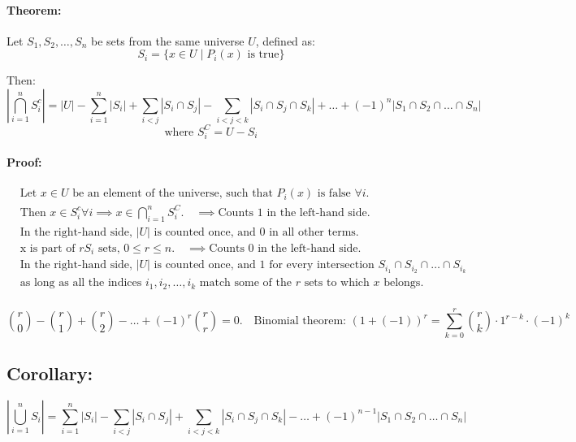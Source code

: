 \documentclass[11pt]{article}
\begin{document}
\paragraph{Theorem:}
Let $S_1, S_2, \dots, S_n$ be sets from the same universe $U$, defined as:
\[
S_i = \{x \in U \mid P_i(x) \text{ is true}\}
\]

Then:
\[
\left| \bigcap_{i=1}^{n} S_i^c \right| = \left| U \right| - \sum_{i=1}^{n} \left| S_i \right| + \sum_{i < j} \left| S_i \cap S_j \right| - \sum_{i < j < k} \left| S_i \cap S_j \cap S_k \right| + \dots + (-1)^n \left| S_1 \cap S_2 \cap \dots \cap S_n \right|
\]
\[
\text{where } S_i^C = U - S_i
\]

\paragraph{Proof:}
\begin{align*}
    &\text{Let } x \in U \text{ be an element of the universe, such that } P_i(x) \text{ is false } \forall i. \\
    &\text{Then } x \in S_i^c \forall i \implies x \in \bigcap_{i=1}^{n} S_i^C. \quad \implies \text{Counts 1 in the left-hand side.} \\
    &\text{In the right-hand side, } \left| U \right| \text{ is counted once, and 0 in all other terms.} \\
    &\text{x is part of } r S_i \text{ sets, } 0 \leq r \leq n. \quad \implies \text{Counts 0 in the left-hand side.} \\
    &\text{In the right-hand side, } \left| U \right| \text{ is counted once, and 1 for every intersection } S_{i_1} \cap S_{i_2} \cap \dots \cap S_{i_k} \\
    &\text{as long as all the indices } i_1, i_2, \dots, i_k \text{ match some of the } r \text{ sets to which } x \text{ belongs.} \\
\end{align*}

\[
\binom{r}{0} - \binom{r}{1} + \binom{r}{2} - \dots + (-1)^r \binom{r}{r} = 0. \quad \text{Binomial theorem: } (1 + (-1))^r = \sum_{k=0}^{r} \binom{r}{k} \cdot 1^{r-k} \cdot (-1)^k 
\]

\subsection*{Corollary:}
\[
\left| \bigcup_{i=1}^{n} S_i \right| = \sum_{i=1}^{n} \left| S_i \right| - \sum_{i < j} \left| S_i \cap S_j \right| + \sum_{i < j < k} \left| S_i \cap S_j \cap S_k \right| - \dots + (-1)^{n-1} \left| S_1 \cap S_2 \cap \dots \cap S_n \right|
\]
\end{document}
